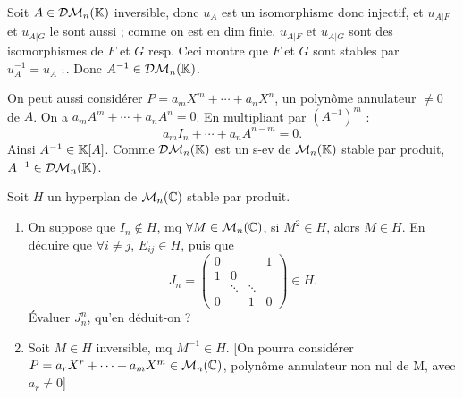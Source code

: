 \begin{solution}
Soit $A\in\mathcal{DM}_n(\mathbb K)$ inversible, donc $u_A$ est un isomorphisme donc injectif, et
$u_{A|F}$ et $u_{A|G}$ le sont aussi ; comme on est en dim finie, $u_{A|F}$ et $u_{A|G}$
sont des isomorphismes de $F$ et $G$ resp. Ceci montre que $F$ et $G$ sont stables par
$u_A^{-1}=u_{A^{-1}}$. Donc $A^{-1}\in\mathcal{DM}_n(\mathbb K)$.

\begin{remarkbox}
On peut aussi considérer $P=a_mX^m+\cdots+a_nX^n$, un polynôme annulateur $\neq0$ de $A$.
On a $a_mA^m+\cdots+a_nA^n=0$. En multipliant par $(A^{-1})^m$ :
\[
a_mI_n+\cdots+a_nA^{n-m}=0.
\]
Ainsi $A^{-1}\in\mathbb K[A]$. Comme $\mathcal{DM}_n(\mathbb K)$ est un s-ev de $\mathcal M_n(\mathbb K)$ stable par produit,
$A^{-1}\in\mathcal{DM}_n(\mathbb K)$.
\end{remarkbox}
\end{solution}


\begin{statementbox}
Soit $H$ un hyperplan de $\mathcal M_n(\mathbb C)$ stable par produit.
\begin{enumerate}[label=\alph*)]
  \item On suppose que $I_n\notin H$, mq $\forall M\in\mathcal M_n(\mathbb C)$, si $M^2\in H$, alors
  $M\in H$. En déduire que $\forall i\neq j$, $E_{ij}\in H$, puis que
  \[
  J_n=\begin{pmatrix}0&&&1\\1&0&&\\&\ddots&\ddots&\\0&&1&0\end{pmatrix}\in H.
  \]
  Évaluer $J_n^n$, qu'en déduit-on ?
  \item Soit $M\in H$ inversible, mq $M^{-1}\in H$.
[On pourra considérer $P=a_rX^r+\cdots+a_mX^m\in\mathcal M_n(\mathbb C)$, polynôme annulateur non nul de M, avec $a_r\neq0$]
\end{enumerate}
\end{statementbox}

